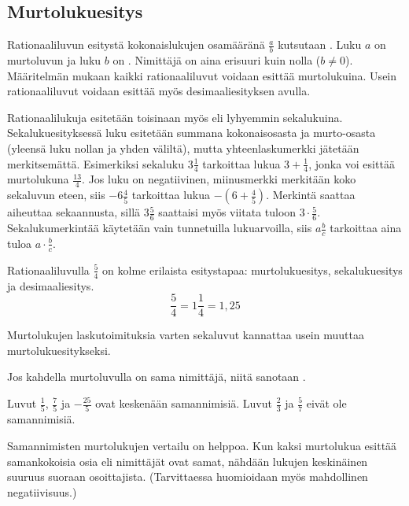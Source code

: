 \subsection{Murtolukuesitys}
Rationaaliluvun esitystä kokonaislukujen osamääränä $\frac{a}{b}$ kutsutaan . Luku $a$ on murtoluvun  ja luku $b$ on . Nimittäjä on aina erisuuri kuin nolla ($b\neq0 $). Määritelmän mukaan kaikki rationaaliluvut voidaan esittää murtolukuina. Usein rationaaliluvut voidaan esittää myös desimaaliesityksen avulla. %

Rationaalilukuja esitetään toisinaan myös  eli lyhyemmin
sekalukuina. Sekalukuesityksessä luku esitetään summana kokonaisosasta ja murto-osasta (yleensä luku nollan
ja yhden väliltä), mutta yhteenlaskumerkki jätetään merkitsemättä. Esimerkiksi sekaluku $3\frac{1}{4}$
tarkoittaa lukua $3 + \frac{1}{4}$, jonka voi esittää murtolukuna $\frac{13}{4}$. Jos luku on negatiivinen,
miinusmerkki merkitään koko sekaluvun eteen, siis $-6\frac{4}{5}$ tarkoittaa lukua $-(6 + \frac{4}{5})$.
Merkintä saattaa aiheuttaa sekaannusta, sillä $3\frac{5}{6}$ saattaisi myös viitata tuloon
$3\cdot \frac{5}{6}$. Sekalukumerkintää käytetään vain tunnetuilla lukuarvoilla, siis $a\frac{b}{c}$ tarkoittaa aina
tuloa $a\cdot \frac{b}{c}$. 

\begin{esimerkki}
        Rationaaliluvulla $\frac{5}{4}$ on kolme erilaista esitystapaa: murtolukuesitys, sekalukuesitys ja desimaaliesitys.
        \[\frac{5}{4} = 1\frac{1}{4}=1,25 \]
    \end{esimerkki} %

Murtolukujen laskutoimituksia varten sekaluvut kannattaa usein muuttaa murtolukuesitykseksi. 
\newpage

Jos kahdella murtoluvulla on sama nimittäjä, niitä sanotaan . %

\begin{esimerkki}
Luvut $\frac15$, $\frac75$ ja $-\frac{25}{5}$ ovat keskenään samannimisiä. Luvut $\frac23$ ja $\frac57$ eivät ole samannimisiä.
\end{esimerkki}

Samannimisten murtolukujen vertailu on helppoa. Kun kaksi murtolukua esittää samankokoisia osia eli nimittäjät ovat samat, nähdään lukujen keskinäinen suuruus suoraan osoittajista. (Tarvittaessa huomioidaan myös mahdollinen negatiivisuus.)

